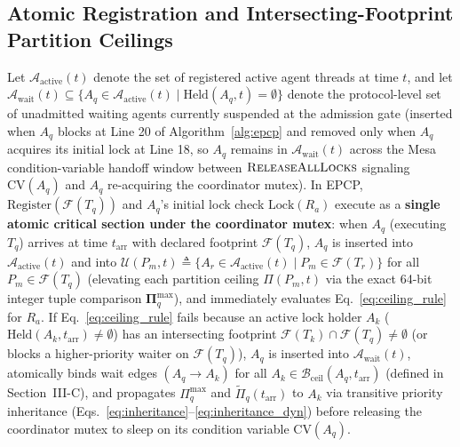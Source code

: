 \documentclass[conference,10pt]{IEEEtran}
\begin{document}
\subsection{Atomic Registration and Intersecting-Footprint Partition Ceilings}
Let $\mathcal{A}_{\text{active}}(t)$ denote the set of registered active agent threads at time $t$, and let $\mathcal{A}_{\text{wait}}(t) \subseteq \{A_q \in \mathcal{A}_{\text{active}}(t) \mid \text{Held}(A_q, t) = \emptyset\}$ denote the protocol-level set of unadmitted waiting agents currently suspended at the admission gate (inserted when $A_q$ blocks at Line 20 of Algorithm~\ref{alg:epcp} and removed only when $A_q$ acquires its initial lock at Line 18, so $A_q$ remains in $\mathcal{A}_{\text{wait}}(t)$ across the Mesa condition-variable handoff window between $\textsc{ReleaseAllLocks}$ signaling $\text{CV}(A_q)$ and $A_q$ re-acquiring the coordinator mutex). In EPCP, $\text{Register}(\mathcal{F}(T_q))$ and $A_q$'s initial lock check $\text{Lock}(R_a)$ execute as a \textbf{single atomic critical section under the coordinator mutex}: when $A_q$ (executing $T_q$) arrives at time $t_{\text{arr}}$ with declared footprint $\mathcal{F}(T_q)$, $A_q$ is inserted into $\mathcal{A}_{\text{active}}(t)$ and into $\mathcal{U}(P_m, t) \triangleq \{A_r \in \mathcal{A}_{\text{active}}(t) \mid P_m \in \mathcal{F}(T_r)\}$ for all $P_m \in \mathcal{F}(T_q)$ (elevating each partition ceiling $\Pi(P_m, t)$ via the exact 64-bit integer tuple comparison $\mathbf{\Pi}_q^{\max}$), and immediately evaluates Eq.~\eqref{eq:ceiling_rule} for $R_a$. If Eq.~\eqref{eq:ceiling_rule} fails because an active lock holder $A_k$ ($\text{Held}(A_k, t_{\text{arr}}) \ne \emptyset$) has an intersecting footprint $\mathcal{F}(T_k) \cap \mathcal{F}(T_q) \ne \emptyset$ (or blocks a higher-priority waiter on $\mathcal{F}(T_q)$), $A_q$ is inserted into $\mathcal{A}_{\text{wait}}(t)$, atomically binds wait edges $(A_q \to A_k)$ for all $A_k \in \mathcal{B}_{\text{ceil}}(A_q, t_{\text{arr}})$ (defined in Section~III-C), and propagates $\Pi_q^{\max}$ and $\tilde{\Pi}_q(t_{\text{arr}})$ to $A_k$ via transitive priority inheritance (Eqs.~\eqref{eq:inheritance}--\eqref{eq:inheritance_dyn}) before releasing the coordinator mutex to sleep on its condition variable $\text{CV}(A_q)$.
\end{document}
